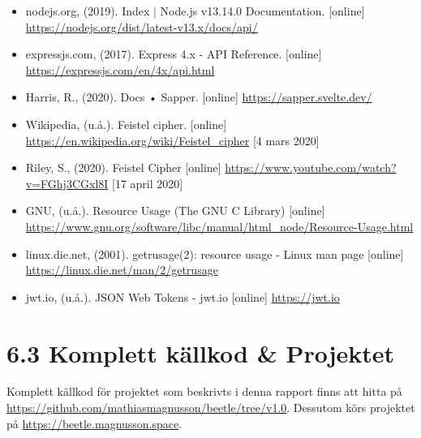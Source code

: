 \documentclass{article}
\begin{document}
\begin{itemize}
	\item nodejs.org, (2019). Index $|$ Node.js v13.14.0 Documentation.
		[online] \url{https://nodejs.org/dist/latest-v13.x/docs/api/}

	\item expressjs.com, (2017). Express 4.x - API Reference. [online]
		\url{https://expressjs.com/en/4x/api.html}

	\item Harris, R., (2020). Docs • Sapper. [online]
		\url{https://sapper.svelte.dev/}

	\item Wikipedia, (u.å.). Feistel cipher. [online]
		\url{https://en.wikipedia.org/wiki/Feistel_cipher} [4 mars 2020]

	\item Riley, S., (2020). Feistel Cipher [online]
		\url{https://www.youtube.com/watch?v=FGhj3CGxl8I} [17 april 2020]

	\item GNU, (u.å.). Resource Usage (The GNU C Library) [online]
		\url{https://www.gnu.org/software/libc/manual/html_node/Resource-Usage.html}

	\item linux.die.net, (2001). getrusage(2): resource usage - Linux man page
		[online] \url {https://linux.die.net/man/2/getrusage}

	\item jwt.io, (u.å.). JSON Web Tokens - jwt.io [online]
		\url{https://jwt.io}

\end{itemize}




\section*{6.3 Komplett källkod \& Projektet}

Komplett källkod för projektet som beskrivts i denna rapport finns att hitta på
\url{https://github.com/mathiasmagnusson/beetle/tree/v1.0}. Dessutom
körs projektet på \url{https://beetle.magnusson.space}.
\end{document}
